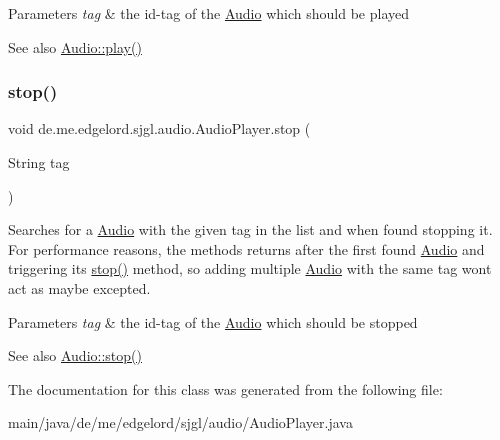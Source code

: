 \begin{DoxyParams}{Parameters}
{\em tag} & the id-\/tag of the {\ttfamily \mbox{\hyperlink{classde_1_1me_1_1edgelord_1_1sjgl_1_1audio_1_1_audio}{Audio}}} which should be played\\
\hline
\end{DoxyParams}
\begin{DoxySeeAlso}{See also}
\mbox{\hyperlink{classde_1_1me_1_1edgelord_1_1sjgl_1_1audio_1_1_audio_ac87651401394ee2e141c099a175cd7cb}{Audio\+::play()}} 
\end{DoxySeeAlso}
\mbox{\label{classde_1_1me_1_1edgelord_1_1sjgl_1_1audio_1_1_audio_player_a52bd650d815c823dc0a5e99b4aeba927}} 
\subsubsection{\texorpdfstring{stop()}{stop()}}
{\footnotesize\ttfamily void de.\+me.\+edgelord.\+sjgl.\+audio.\+Audio\+Player.\+stop (\begin{DoxyParamCaption}\item[{String}]{tag }\end{DoxyParamCaption})}

Searches for a {\ttfamily \mbox{\hyperlink{classde_1_1me_1_1edgelord_1_1sjgl_1_1audio_1_1_audio}{Audio}}} with the given tag in the list and when found stopping it. For performance reasons, the methods returns after the first found {\ttfamily \mbox{\hyperlink{classde_1_1me_1_1edgelord_1_1sjgl_1_1audio_1_1_audio}{Audio}}} and triggering its {\ttfamily \mbox{\hyperlink{classde_1_1me_1_1edgelord_1_1sjgl_1_1audio_1_1_audio_player_a52bd650d815c823dc0a5e99b4aeba927}{stop()}}} method, so adding multiple {\ttfamily \mbox{\hyperlink{classde_1_1me_1_1edgelord_1_1sjgl_1_1audio_1_1_audio}{Audio}}} with the same tag won\textquotesingle{}t act as maybe excepted.


\begin{DoxyParams}{Parameters}
{\em tag} & the id-\/tag of the {\ttfamily \mbox{\hyperlink{classde_1_1me_1_1edgelord_1_1sjgl_1_1audio_1_1_audio}{Audio}}} which should be stopped\\
\hline
\end{DoxyParams}
\begin{DoxySeeAlso}{See also}
\mbox{\hyperlink{classde_1_1me_1_1edgelord_1_1sjgl_1_1audio_1_1_audio_a2e9d9c2e43c4bab399c7f360c8f90ce2}{Audio\+::stop()}} 
\end{DoxySeeAlso}


The documentation for this class was generated from the following file\+:\begin{DoxyCompactItemize}
\item 
main/java/de/me/edgelord/sjgl/audio/Audio\+Player.\+java\end{DoxyCompactItemize}
